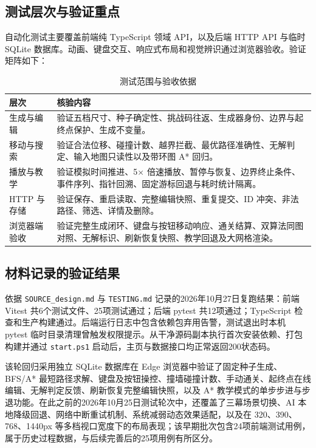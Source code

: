 \documentclass[a4paper]{article}
\begin{document}
\subsection{测试层次与验证重点}
自动化测试主要覆盖前端纯 TypeScript 领域 API，以及后端 HTTP API 与临时 SQLite 数据库。动画、键盘交互、响应式布局和视觉辨识通过浏览器验收。验证矩阵如下：
\begin{table}[htbp]
\centering
\caption{测试范围与验收依据}
\small
\begin{tabularx}{\textwidth}{p{2.5cm}X}
\toprule
层次 & 核验内容 \\
\midrule
生成与编辑 & 验证五档尺寸、种子确定性、挑战码往返、生成器身份、边界与起终点保护、生成不变量。\\
移动与搜索 & 验证合法位移、碰撞计数、越界拦截、最优路径准确性、无解判定、输入地图只读性以及带环图 A* 回归。\\
播放与教学 & 验证模拟时间推进、5× 倍速播放、暂停与恢复、边界终止条件、事件序列、指针回溯、固定游标回退与耗时统计隔离。\\
HTTP 与存储 & 验证保存、重启读取、完整编辑快照、重复提交、ID 冲突、非法路径、筛选、详情及删除。\\
浏览器端验收 & 验证完整生成闭环、键盘与按钮移动响应、通关结算、双算法同图对照、无解标识、刷新恢复快照、教学回退及大网格渲染。\\
\bottomrule
\end{tabularx}
\end{table}

\subsection{材料记录的验证结果}
依据 \texttt{SOURCE\_design.md} 与 \texttt{TESTING.md} 记录的2026年10月27日复跑结果：前端 Vitest 共6个测试文件、25项测试通过；后端 pytest 共12项通过；TypeScript 检查和生产构建通过。后端运行日志中包含依赖包弃用告警，测试退出时本机 pytest 临时目录清理曾触发权限提示。从干净源码副本执行首次安装依赖、打包构建并通过 \texttt{start.ps1} 启动后，主页与数据接口均正常返回200状态码。

该轮回归采用独立 SQLite 数据库在 Edge 浏览器中验证了固定种子生成、BFS/A* 最短路径求解、键盘及按钮操控、撞墙碰撞计数、手动通关、起终点在线编辑、无解判定反馈、刷新恢复完整编辑快照，以及 A* 教学模式的单步步进与步退功能。在此之前的2026年10月25日测试轮次中，还覆盖了三幕场景切换、AI 本地降级回退、网络中断重试机制、系统减弱动态效果适配，以及在 320、390、768、1440px 等多档视口宽度下的布局表现；该早期批次包含24项前端测试用例，属于历史过程数据，与后续完善后的25项用例有所区分。
\end{document}
